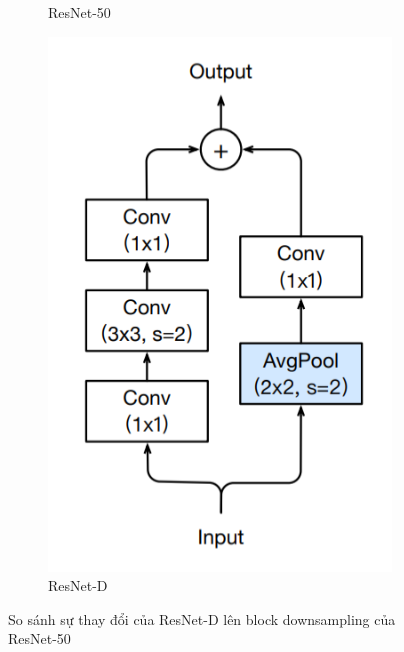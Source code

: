 \begin{enumerate}
\begin{figure}[H]
\begin{subfigure}[b]{0.5\textwidth}
        \caption{ResNet-50}
        \label{fig:skip1}
    \end{subfigure}
    \hspace{1cm}
    \begin{subfigure}[b]{0.3\textwidth}
        \centering
        \includegraphics[width=\textwidth]{img/03-resnet_d.png}
        \caption{ResNet-D}
        \label{fig:skip2}
    \end{subfigure}
    \caption{So sánh sự thay đổi của ResNet-D lên block downsampling của ResNet-50}
    \label{fig:resnet_compare}
\end{figure}


\end{enumerate}
